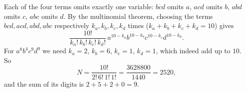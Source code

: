Each of the four terms omits exactly one variable: $bcd$ omits $a$, $acd$ omits $b$, $abd$ omits $c$, $abc$ omits $d$. By the multinomial theorem, choosing the terms $bcd,acd,abd,abc$ respectively $k_a,k_b,k_c,k_d$ times ($k_a+k_b+k_c+k_d=10$) gives
\[
\dfrac{10!}{k_a!\,k_b!\,k_c!\,k_d!}\,a^{10-k_a}b^{10-k_b}c^{10-k_c}d^{10-k_d}.
\]
For $a^8b^4c^9d^9$ we need $k_a=2$, $k_b=6$, $k_c=1$, $k_d=1$, which indeed add up to $10$. So
\[
N=\dfrac{10!}{2!\,6!\,1!\,1!}=\dfrac{3628800}{1440}=2520 ,
\]
and the sum of its digits is $2+5+2+0=\boxed{9}$.
